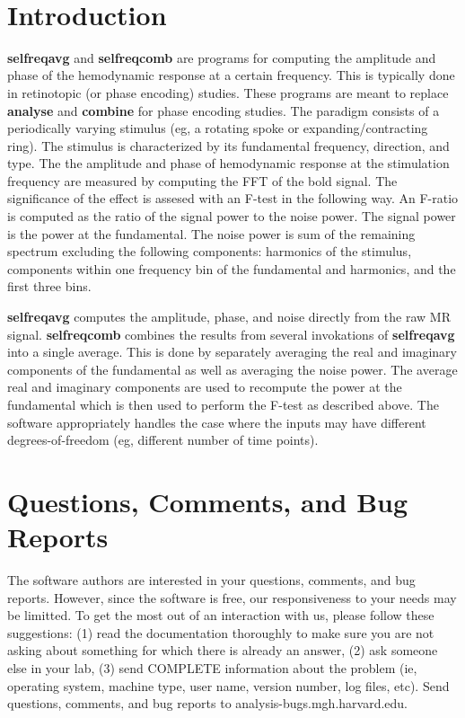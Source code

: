 \documentclass[10pt]{article}
\begin{document}
\begin{Large}
 \\
\end{Large}

\section{Introduction}
{\bf selfreqavg} and {\bf selfreqcomb} are programs for computing the
amplitude and phase of the hemodynamic response at a certain
frequency.  This is typically done in retinotopic (or phase encoding)
studies.  These programs are meant to replace {\bf analyse} and {\bf
combine} for phase encoding studies.  The paradigm consists of a
periodically varying stimulus (eg, a rotating spoke or
expanding/contracting ring).  The stimulus is characterized by its
fundamental frequency, direction, and type.  The the amplitude and
phase of hemodynamic response at the stimulation frequency are measured
by computing the FFT of the bold signal.  The significance of the
effect is assesed with an F-test in the following way. An F-ratio is
computed as the ratio of the signal power to the noise power. The
signal power is the power at the fundamental. The noise power is sum
of the remaining spectrum excluding the following components:
harmonics of the stimulus, components within one frequency bin of the
fundamental and harmonics, and the first three bins.

{\bf selfreqavg} computes the amplitude, phase, and noise directly
from the raw MR signal.  {\bf selfreqcomb} combines the results from
several invokations of {\bf selfreqavg} into a single average. This is
done by separately averaging the real and imaginary components of the
fundamental as well as averaging the noise power. The average real and
imaginary components are used to recompute the power at the
fundamental which is then used to perform the F-test as described
above. The software appropriately handles the case where the inputs
may have different degrees-of-freedom (eg, different number of time
points).\\


\section{Questions, Comments, and Bug Reports}
The software authors are interested in your questions, comments, and
bug reports.  However, since the software is free, our responsiveness
to your needs may be limitted.  To get the most out of an interaction
with us, please follow these suggestions: (1) read the documentation
thoroughly to make sure you are not asking about something for which
there is already an answer, (2) ask someone else in your
lab, (3) send COMPLETE information about the problem (ie, operating
system, machine type, user name, version number, log files, etc).
Send questions, comments, and bug reports to analysis-bugs\@nmr.mgh.harvard.edu.\\
\end{document}
